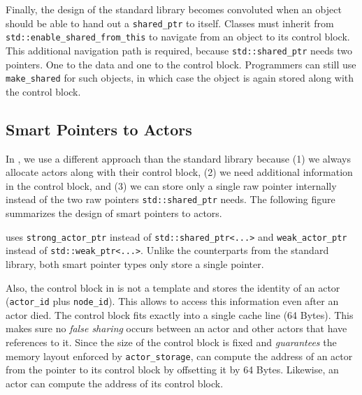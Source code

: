 
Finally, the design of the standard library becomes convoluted when an object should be able to hand out a \lstinline^shared_ptr^ to itself. Classes must inherit from \lstinline^std::enable_shared_from_this^ to navigate from an object to its control block. This additional navigation path is required, because \lstinline^std::shared_ptr^ needs two pointers. One to the data and one to the control block. Programmers can still use \lstinline^make_shared^ for such objects, in which case the object is again stored along with the control block.

\subsection{Smart Pointers to Actors}

In \lib, we use a different approach than the standard library because (1) we always allocate actors along with their control block, (2) we need additional information in the control block, and (3) we can store only a single raw pointer internally instead of the two raw pointers \lstinline^std::shared_ptr^ needs. The following figure summarizes the design of smart pointers to actors.



\lib uses \lstinline^strong_actor_ptr^ instead of \lstinline^std::shared_ptr<...>^ and \lstinline^weak_actor_ptr^ instead of \lstinline^std::weak_ptr<...>^. Unlike the counterparts from the standard library, both smart pointer types only store a single pointer.

Also, the control block in \lib is not a template and stores the identity of an actor (\lstinline^actor_id^ plus \lstinline^node_id^). This allows \lib to access this information even after an actor died. The control block fits exactly into a single cache line (64 Bytes). This makes sure no \emph{false sharing} occurs between an actor and other actors that have references to it. Since the size of the control block is fixed and \lib \emph{guarantees} the memory layout enforced by \lstinline^actor_storage^, \lib can compute the address of an actor from the pointer to its control block by offsetting it by 64 Bytes. Likewise, an actor can compute the address of its control block.

